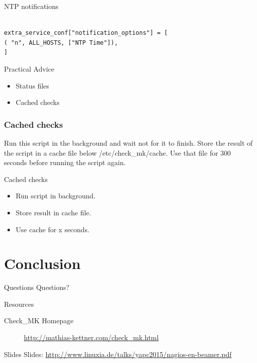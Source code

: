\begin{frame}[fragile]{NTP notifications}

\begin{lstlisting}

extra_service_conf["notification_options"] = [
( "n", ALL_HOSTS, ["NTP Time"]),
]

\end{lstlisting}
\end{frame}

\begin{frame}{Practical Advice}
\begin{itemize}
\item Status files
\item Cached checks
\end{itemize}
\end{frame}

\subsubsection{Cached checks}

Run this script in the background and wait not for it to finish.
Store the result of the script in a cache file below /etc/check\_mk/cache.
Use that file for 300 seconds before running the script again.

\begin{frame}{Cached checks}
\begin{itemize}
\item Run script in background.
\item Store result in cache file.
\item Use cache for x seconds.
\end{itemize}
\end{frame}

\section{Conclusion}

\begin{frame}{Questions}
Questions?
\end{frame}

\begin{frame}[fragile]{Resources}
\begin{description}
\item[Check\_MK Homepage] \url{http://mathias-kettner.com/check_mk.html}
\end{description}
\end{frame}

\begin{frame}{Slides}
Slides:
\url{http://www.linuxia.de/talks/yapc2015/nagios-en-beamer.pdf}
\end{frame}




